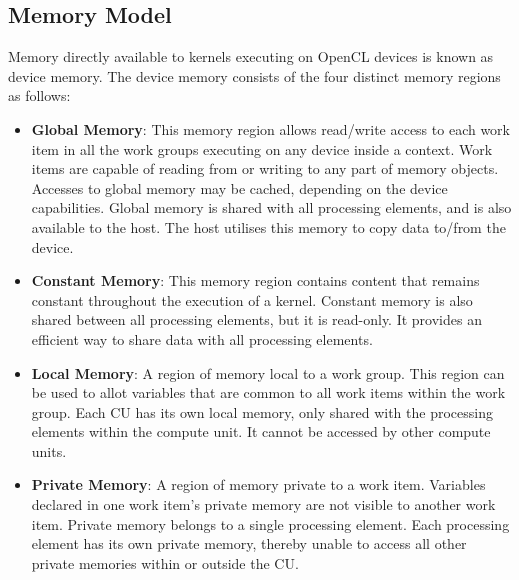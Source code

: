 \subsection{Memory Model}
\label{sect4_1_2}
Memory directly available to kernels executing on OpenCL devices is known as device memory. The device memory consists of the four distinct memory regions as follows: 
\begin{itemize}
\item \textbf{Global Memory}: This memory region allows read/write access to each work item in all the work groups executing on any device inside a context. Work items are capable of reading from or writing to any part of memory objects. Accesses to global memory may be cached, depending on the device capabilities. \newline\newline
Global memory is shared with all processing elements, and is also available to the host. The host utilises this memory to copy data to/from the device.

\item \textbf{Constant Memory}: This memory region contains content that remains constant throughout the execution of a kernel. \newline\newline
Constant memory is also shared between all processing elements, but it is read-only. It provides an efficient way to share data with all processing elements.

\item \textbf{Local Memory}: A region of memory local to a work group. This region can be used to allot variables that are common to all work items within the work group.\newline\newline
Each CU has its own local memory, only shared with the processing elements within the compute unit. It cannot be accessed by other compute units. 

\item \textbf{Private Memory}: A region of memory private to a work item. Variables declared in one work item’s private memory are not visible to another work item.\newline\newline
Private memory belongs to a single processing element. Each processing element has its own private memory, thereby unable to access all other private memories within or outside the CU.


\end{itemize}
